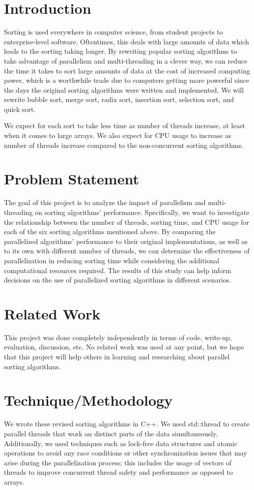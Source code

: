 \documentclass[conference]{IEEEtran}
\begin{document}
\section{Introduction}
Sorting is used everywhere in computer science, from student projects to enterprise-level software. Oftentimes, this deals with large amounts of data which leads to the sorting taking longer. By rewriting popular sorting algorithms to take advantage of parallelism and multi-threading in a clever way, we can reduce the time it takes to sort large amounts of data at the cost of increased computing power, which is a worthwhile trade due to computers getting more powerful since the days the original sorting algorithms were written and implemented. We will rewrite bubble sort, merge sort, radix sort, insertion sort, selection sort, and quick sort. 

We expect for each sort to take less time as number of threads increase, at least when it comes to large arrays. We also expect for CPU usage to increase as number of threads increase compared to the non-concurrent sorting algorithms.

\section{Problem Statement}
The goal of this project is to analyze the impact of parallelism and multi-threading on sorting algorithms' performance. Specifically, we want to investigate the relationship between the number of threads, sorting time, and CPU usage for each of the six sorting algorithms mentioned above. By comparing the parallelized algorithms' performance to their original implementations, as well as to its own with different number of threads, we can determine the effectiveness of parallelization in reducing sorting time while considering the additional computational resources required. The results of this study can help inform decisions on the use of parallelized sorting algorithms in different scenarios.

\section{Related Work}
This project was done completely independently in terms of code, write-up, evaluation, discussion, etc. No related work was used at any point, but we hope that this project will help others in learning and researching about parallel sorting algorithms.

\section{Technique/Methodology}
We wrote these revised sorting algorithms in C++. We used std::thread to create parallel threads that work on distinct parts of the data simultaneously. Additionally, we used techniques such as lock-free data structures and atomic operations to avoid any race conditions or other synchronization issues that may arise during the parallelization process; this includes the usage of vectors of threads to improve concurrent thread safety and performance as opposed to arrays.
\end{document}
